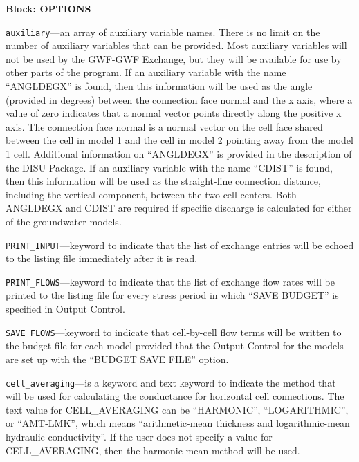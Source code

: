 
\item \textbf{Block: OPTIONS}

\begin{description}
\item \texttt{auxiliary}---an array of auxiliary variable names.  There is no limit on the number of auxiliary variables that can be provided. Most auxiliary variables will not be used by the GWF-GWF Exchange, but they will be available for use by other parts of the program.  If an auxiliary variable with the name ``ANGLDEGX'' is found, then this information will be used as the angle (provided in degrees) between the connection face normal and the x axis, where a value of zero indicates that a normal vector points directly along the positive x axis.  The connection face normal is a normal vector on the cell face shared between the cell in model 1 and the cell in model 2 pointing away from the model 1 cell.  Additional information on ``ANGLDEGX'' is provided in the description of the DISU Package.  If an auxiliary variable with the name ``CDIST'' is found, then this information will be used as the straight-line connection distance, including the vertical component, between the two cell centers.  Both ANGLDEGX and CDIST are required if specific discharge is calculated for either of the groundwater models.

\item \texttt{PRINT\_INPUT}---keyword to indicate that the list of exchange entries will be echoed to the listing file immediately after it is read.

\item \texttt{PRINT\_FLOWS}---keyword to indicate that the list of exchange flow rates will be printed to the listing file for every stress period in which ``SAVE BUDGET'' is specified in Output Control.

\item \texttt{SAVE\_FLOWS}---keyword to indicate that cell-by-cell flow terms will be written to the budget file for each model provided that the Output Control for the models are set up with the ``BUDGET SAVE FILE'' option.

\item \texttt{cell\_averaging}---is a keyword and text keyword to indicate the method that will be used for calculating the conductance for horizontal cell connections.  The text value for CELL\_AVERAGING can be ``HARMONIC'', ``LOGARITHMIC'', or ``AMT-LMK'', which means ``arithmetic-mean thickness and logarithmic-mean hydraulic conductivity''. If the user does not specify a value for CELL\_AVERAGING, then the harmonic-mean method will be used.


\end{description}
